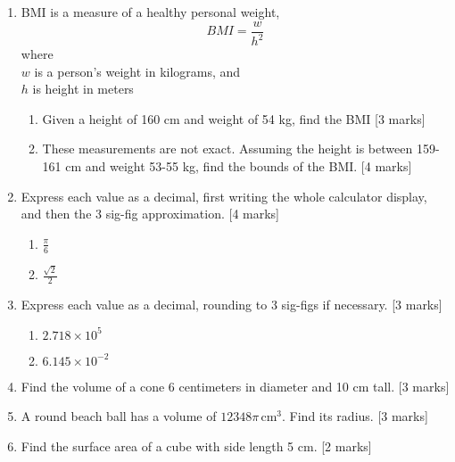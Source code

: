 \documentclass[12pt, twoside]{article}
\begin{document}
\begin{enumerate}
\newpage

\item BMI is a measure of a healthy personal weight, 
  \[\displaystyle BMI = \frac{w}{h^2}\]
    where \\
    $w$ is a person's weight in kilograms, and \\
    $h$ is height in meters
    \begin{enumerate} 
        \item Given a height of 160 cm and weight of 54 kg, find the BMI  \hfill [3 marks]
        \item These measurements are not exact. Assuming the height is between 159-161 cm and weight 53-55 kg, find the bounds of the BMI.  \hfill [4 marks]
      \end{enumerate}


\item Express each value as a decimal, first writing the whole calculator display, and then the 3 sig-fig approximation. \hfill [4 marks]
  \begin{multicols}{2}
    \begin{enumerate}
    \item $\displaystyle \frac{\pi}{6}$
    \item $\displaystyle \frac{\sqrt{2}}{2}$
    \end{enumerate}
  \end{multicols}

\item Express each value as a decimal, rounding to 3 sig-figs if necessary. \hfill [3 marks]
  \begin{multicols}{2}
    \begin{enumerate}
    \item $2.718 \times 10^5$
    \item $6.145 \times 10^{-2}$
    \end{enumerate}
  \end{multicols}

\item Find the volume of a cone 6 centimeters in diameter and 10 cm tall. \hfill [3 marks]
  
\item A round beach ball has a volume of $12348\pi \,\mathrm{ cm}^3$. Find its radius. \hfill [3 marks]
  
\item Find the surface area of a cube with side length 5 cm. \hfill [2 marks]
  

\end{enumerate}
\end{document}
